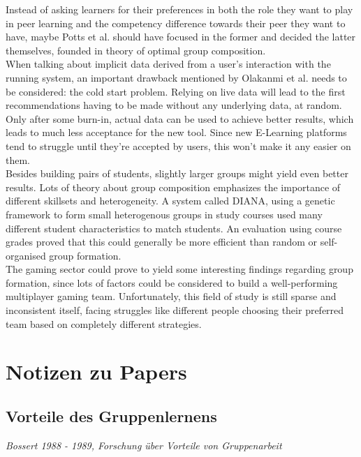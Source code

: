 \documentclass[nochapterpage,bigchapter,linedtoc,longdoc,colorback,accentcolor=tud3b,oneside]{tudreport}
\begin{document}
Instead of asking learners for their preferences in both the role they want to play in peer learning and the competency difference towards their peer they want to have, maybe Potts et al. should have focused in the former and decided the latter themselves, founded in theory of optimal group composition. \cite{manske2015using}\\
When talking about implicit data derived from a user's interaction with the running system, an important drawback mentioned by Olakanmi et al. needs to be considered: the cold start problem. \cite{olakanmi2017group} Relying on live data will lead to the first recommendations having to be made without any underlying data, at random. Only after some burn-in, actual data can be used to achieve better results, which leads to much less acceptance for the new tool. Since new E-Learning platforms tend to struggle until they're accepted by users, this won't make it any easier on them.\\

Besides building pairs of students, slightly larger groups might yield even better results. Lots of theory about group composition emphasizes the importance of different skillsets and heterogeneity. \cite{olakanmi2017group, blumenfeld1996learning, manske2015using} A system called DIANA, using a genetic framework to form small heterogenous groups in study courses used many different student characteristics to match students. An evaluation using course grades proved that this could generally be more efficient than random or self-organised group formation.\\
The gaming sector could prove to yield some interesting findings regarding group formation, since lots of factors could be considered to build a well-performing multiplayer gaming team. \cite{delalleau2012beyond, wang2015thinking, suznjevic2015application} Unfortunately, this field of study is still sparse and inconsistent itself, facing struggles like different people choosing their preferred team based on completely different strategies. \cite{riegelsberger2007personality}\\


\chapter{Notizen zu Papers}

\section{Vorteile des Gruppenlernens}
\textit{Bossert 1988 - 1989, Forschung über Vorteile von Gruppenarbeit \cite{bossert1982instructional}}\\
\end{document}
